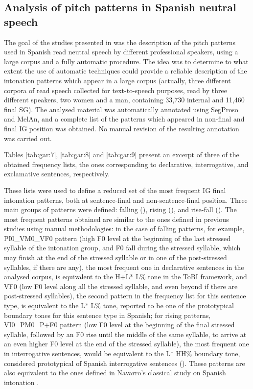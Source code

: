 \documentclass[output=paper]{langsci/langscibook}
\begin{document}
\subsection{Analysis of pitch patterns in Spanish neutral speech}

The goal of the studies presented in \citep{Garrido2012enton,Garrido2012acent} was the description of the pitch patterns used in Spanish read neutral speech by different professional speakers, using a large corpus and a fully automatic procedure. The idea was to determine to what extent the use of automatic techniques could provide a reliable description of the intonation patterns which appear in a large corpus (actually, three different corpora of read speech collected for text-to-speech purposes, read by three different speakers, two women and a man, containing 33,730 internal and 11,460 final SG). The analysed material was automatically annotated using SegProso and MelAn, and a complete list of the patterns which appeared in non-final \citep{Garrido2012acent} and final \citep{Garrido2012enton} IG position was obtained. No manual revision of the resulting annotation was carried out.

Tables \ref{tab:gar:7}, \ref{tab:gar:8} and \ref{tab:gar:9}  present an excerpt of three of the obtained frequency lists, the ones corresponding to declarative, interrogative, and exclamative sentences, respectively.\largerpage

These lists were used to define a reduced set of the most frequent IG final intonation patterns, both at sentence-final and non-sentence-final position. Three main groups of patterns were defined: falling (), rising (), and rise-fall (). The most frequent patterns obtained are similar to the ones defined in previous studies using manual methodologies: in the case of falling patterns, for example, PI0\_VM0\_VF0 pattern (high F0 level at the beginning of the last stressed syllable of the intonation group, and F0 fall during the stressed syllable, which may finish at the end of the stressed syllable or in one of the post-stressed syllables, if there are any), the most frequent one in declarative sentences in the analysed corpus, is equivalent to the H+L* L\% tone in the ToBI framework, and VF0 (low F0 level along all the stressed syllable, and even beyond if there are post-stressed syllables), the second pattern in the frequency list for this sentence type, is equivalent to the L* L\% tone, reported to be one of the prototypical boundary tones for this sentence type in Spanish; for rising patterns, VI0\_PM0\_P+F0 pattern (low F0 level at the beginning of the final stressed syllable, followed by an F0 rise until the middle of the same syllable, to arrive at an even higher F0 level at the end of the stressed syllable), the most frequent one in interrogative sentences, would be equivalent to the L* HH\% boundary tone, considered prototypical of Spanish interrogative sentences (\citealt{EstebasVilaplanaPrieto.2008}). These patterns are also equivalent to the ones defined in Navarro’s classical study on Spanish intonation \citep{NavarroTomas.1944}.
\end{document}
